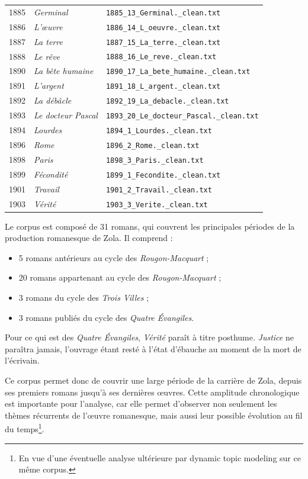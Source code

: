 \begin{longtable}{p{1.6cm}p{4.2cm}p{8cm}}
1885 & \textit{Germinal} & \texttt{1885\_13\_Germinal.\_clean.txt} \\
1886 & \textit{L'œuvre} & \texttt{1886\_14\_L\_oeuvre.\_clean.txt} \\
1887 & \textit{La terre} & \texttt{1887\_15\_La\_terre.\_clean.txt} \\
1888 & \textit{Le rêve} & \texttt{1888\_16\_Le\_reve.\_clean.txt} \\
1890 & \textit{La bête humaine} & \texttt{1890\_17\_La\_bete\_humaine.\_clean.txt} \\
1891 & \textit{L'argent} & \texttt{1891\_18\_L\_argent.\_clean.txt} \\
1892 & \textit{La débâcle} & \texttt{1892\_19\_La\_debacle.\_clean.txt} \\
1893 & \textit{Le docteur Pascal} & \texttt{1893\_20\_Le\_docteur\_Pascal.\_clean.txt} \\
1894 & \textit{Lourdes} & \texttt{1894\_1\_Lourdes.\_clean.txt} \\
1896 & \textit{Rome} & \texttt{1896\_2\_Rome.\_clean.txt} \\
1898 & \textit{Paris} & \texttt{1898\_3\_Paris.\_clean.txt} \\
1899 & \textit{Fécondité} & \texttt{1899\_1\_Fecondite.\_clean.txt} \\
1901 & \textit{Travail} & \texttt{1901\_2\_Travail.\_clean.txt} \\
1903 & \textit{Vérité} & \texttt{1903\_3\_Verite.\_clean.txt} \\

\bottomrule
\end{longtable}

Le corpus est composé de 31 romans, qui couvrent les principales périodes de la production romanesque de Zola. Il comprend :

\begin{itemize}
    \item 5 romans antérieurs au cycle des \textit{Rougon-Macquart} ;
    \item 20 romans appartenant au cycle des \textit{Rougon-Macquart} ;
    \item 3 romans du cycle des \textit{Trois Villes} ;
    \item 3 romans publiés du cycle des \textit{Quatre Évangiles}.
\end{itemize}

Pour ce qui est des \textit{Quatre Évangiles}, \textit{Vérité} paraît à titre posthume. \textit{Justice} ne paraîtra jamais, l'ouvrage étant resté à l'état d'ébauche au moment de la mort de l'écrivain.

Ce corpus permet donc de couvrir une large période de la carrière de Zola, depuis ses premiers romans jusqu'à ses dernières œuvres. Cette amplitude chronologique est importante pour l'analyse, car elle permet d'observer non seulement les thèmes récurrents de l'œuvre romanesque, mais aussi leur possible évolution au fil du temps\footnote{En vue d'une éventuelle analyse ultérieure par dynamic topic modeling sur ce même corpus.}.